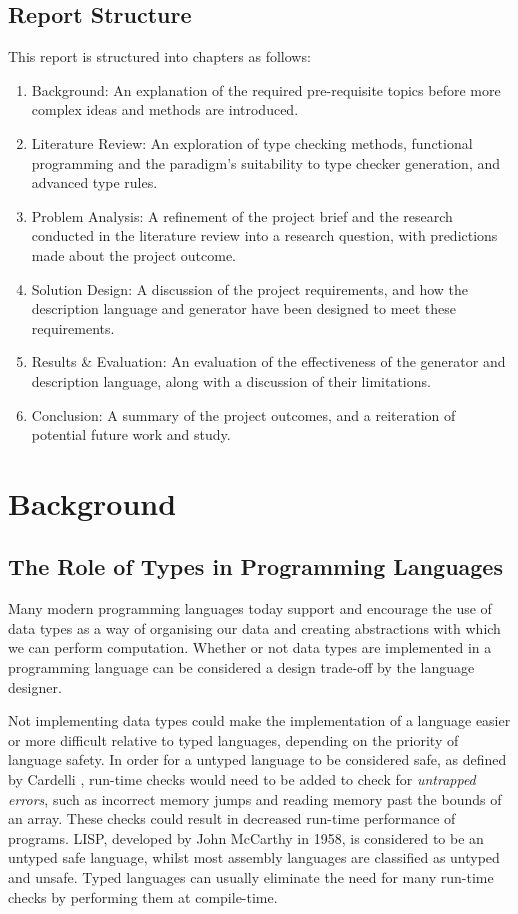 \documentclass{UoYCSproject}
\begin{document}
\section{Report Structure}
This report is structured into chapters as follows:
\begin{enumerate}
    \item Background: An explanation of the required pre-requisite topics
        before more complex ideas and methods are introduced.
    \item Literature Review: An exploration of type checking methods,
        functional programming and the paradigm's suitability to type checker 
        generation, and advanced type rules.
    \item Problem Analysis: A refinement of the project brief and the research
        conducted in the literature review into a research question, with
        predictions made about the project outcome.
    \item Solution Design: A discussion of the project requirements, and how
        the description language and generator have been designed to meet these
        requirements.
    \item Results \& Evaluation: An evaluation of the effectiveness of the 
        generator and description language, along with a discussion of their
        limitations. 
    \item Conclusion: A summary of the project outcomes, and a reiteration of
        potential future work and study.
\end{enumerate}

\chapter{Background}

\section{The Role of Types in Programming Languages}
Many modern programming languages today support and encourage the use of data
types as a way of organising our data and creating abstractions with which
we can perform computation. Whether or not data types are implemented in a
programming language can be considered a design trade-off by the language
designer.

Not implementing data types could make the implementation of a language easier
or more difficult relative to typed languages, depending on the priority of
language safety. In order for a untyped language to be considered safe, as
defined by Cardelli \cite[p.~3]{CSHandbook}, run-time checks would need to be added
to check for \textit{untrapped errors}, such as incorrect memory jumps and
reading memory past the bounds of an array. These checks could result in
decreased run-time performance of programs. LISP, developed by John McCarthy in
1958, is considered to be an untyped safe language, whilst most assembly
languages are classified as untyped and unsafe. Typed languages can usually
eliminate the need for many run-time checks by performing them at compile-time.
\end{document}
